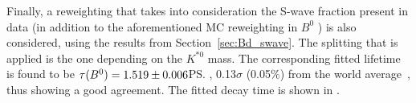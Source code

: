 Finally, a reweighting that takes into consideration the S-wave fraction present in
data (in addition to the aforementioned MC reweighting in $B^0$ \pt) is also
considered, using the results from Section~\ref{sec:Bd_swave}.
The splitting that is applied is the one depending on the $K^{*0}$
mass. The corresponding fitted lifetime is found to be  $\tau(B^0) =
1.519\pm0.006$\ps, 0.13$\sigma$ (0.05\%) from the world average~\cite{HFLAV2017},
thus showing a good agreement. The fitted decay time is shown in
. 

\begin{table}[th]
\caption{\label{tab:tauB0}\small Values of $\tau(B^{0})$ obtained for validation of the time acceptance method for the different considered splittings, with (first column) and without reweighting MC in $p_{T}^{B}$.}
\end{table}

